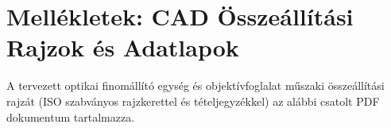 \documentclass[12pt,a4paper]{article}
\begin{document}
\newpage
\appendix
\section{Mellékletek: CAD Összeállítási Rajzok és Adatlapok}
\label{sec:melleklet}

A tervezett optikai finomállító egység és objektívfoglalat műszaki összeállítási rajzát (ISO szabványos rajzkerettel és tételjegyzékkel) az alábbi csatolt PDF dokumentum tartalmazza.


\end{document}
